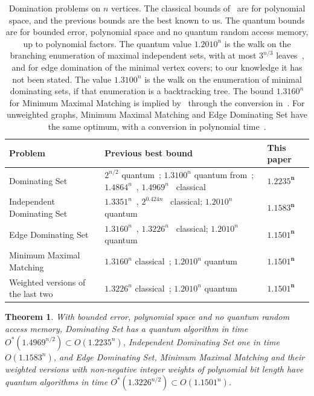 \documentclass[11pt]{article}
\newtheorem{theorem}{Theorem}[section]
\theoremstyle{remark}
\begin{document}
\begin{table}[h]
\centering
\small
\renewcommand{\arraystretch}{1.2}
\begin{tabular}{@{}p{4.3cm}p{7.6cm}l@{}}
\toprule
Problem & Previous best bound & This paper\\
\midrule
Dominating Set & $2^{n/2}$ quantum~\cite{WCCV23}; $1.3100^n$ quantum from~\cite{FGPS08}; $1.4864^n$~\cite{Iwa11}, $1.4969^n$~\cite{RB11} classical & $\mathbf{1.2235^n}$\\
Independent Dominating Set & $1.3351^n$~\cite{BDEP13}, $2^{0.424n}$~\cite{BEP10} classical; $1.2010^n$ quantum & $\mathbf{1.1583^n}$\\
Edge Dominating Set & $1.3160^n$~\cite{XN14}, $1.3226^n$~\cite{RB12} classical; $1.2010^n$ quantum & $\mathbf{1.1501^n}$\\
Minimum Maximal Matching & $1.3160^n$ classical~\cite{XN14,RB12}; $1.2010^n$ quantum & $\mathbf{1.1501^n}$\\
Weighted versions of the last two & $1.3226^n$ classical~\cite{RB12}; $1.2010^n$ quantum & $\mathbf{1.1501^n}$\\
\bottomrule
\end{tabular}
\caption{Domination problems on $n$ vertices. The classical bounds of~\cite{Iwa11,RB11,RB12,BEP10} are for polynomial space, and the previous bounds are the best known to us. The quantum bounds are for bounded error, polynomial space and no quantum random access memory, up to polynomial factors. The quantum value $1.2010^n$ is the walk on the branching enumeration of maximal independent sets, with at most $3^{n/3}$ leaves~\cite{MM65}, and for edge domination of the minimal vertex covers; to our knowledge it has not been stated. The value $1.3100^n$ is the walk on the enumeration of minimal dominating sets, if that enumeration is a backtracking tree. The bound $1.3160^n$ for Minimum Maximal Matching is implied by~\cite{XN14} through the conversion in~\cite{RB12}. For unweighted graphs, Minimum Maximal Matching and Edge Dominating Set have the same optimum, with a conversion in polynomial time~\cite{RB12}.}
\label{tab:dom}
\end{table}

\begin{theorem}\label{thm:dom}
With bounded error, polynomial space and no quantum random access memory, Dominating Set has a quantum algorithm in time $O^*(1.4969^{n/2}) \subset O(1.2235^n)$, Independent Dominating Set one in time $O(1.1583^n)$, and Edge Dominating Set, Minimum Maximal Matching and their weighted versions with non-negative integer weights of polynomial bit length have quantum algorithms in time $O^*(1.3226^{n/2}) \subset O(1.1501^n)$.
\end{theorem}
\end{document}
